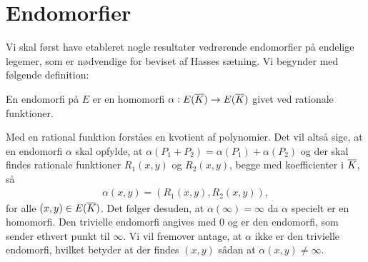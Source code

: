 \section{Endomorfier}
Vi skal først have etableret nogle resultater vedrørende endomorfier på endelige legemer, som
er nødvendige for beviset af Hasses sætning. Vi begynder med følgende definition:

\begin{definition}
En endomorfi på $E$ er en homomorfi $\alpha : E(\overline{K}) \to E(\overline{K})$ givet
ved rationale funktioner.
\end{definition}

Med en rational funktion forståes en kvotient af polynomier. Det vil altså sige, at 
en endomorfi $\alpha$ skal opfylde, at $\alpha(P_1 + P_2) = \alpha(P_1) + \alpha(P_2)$ 
og der skal findes rationale 
funktioner $R_1(x, y)$ og $R_2(x, y)$, begge med koefficienter i $\overline{K}$, så
\begin{align*}
	\alpha(x, y) = (R_1(x, y), R_2(x, y)),
\end{align*}
for alle $(x, y) \in E(\overline{K})$. Det følger desuden, at $\alpha(\infty) = \infty$ da 
$\alpha$ specielt er en homomorfi. Den trivielle endomorfi angives med $0$ og er den endomorfi, som sender ethvert punkt til $\infty$. Vi vil fremover antage, at $\alpha$ ikke er den trivielle endomorfi, hvilket betyder at der findes $(x, y)$ sådan at $\alpha(x, y) \neq \infty$.


